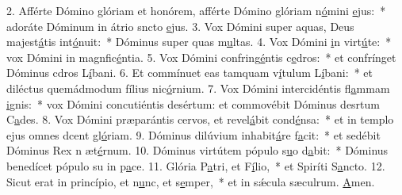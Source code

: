 2. Afférte Dómino glóriam et honórem, afférte Dómino glóriam n\uline{ó}mini \uline{e}jus:~* adoráte Dóminum in átrio sncto \uline{e}jus.
3. Vox Dómini super aquas, Deus majest\uline{á}tis int\uline{ó}nuit:~* Dóminus super quas m\uline{u}ltas.
4. Vox Dómini \uline{i}n virt\uline{ú}te:~* vox Dómini in magnfic\uline{é}ntia.
5. Vox Dómini confring\uline{é}ntis c\uline{e}dros:~* et confrínget Dóminus cdros L\uline{í}bani.
6. Et commínuet eas tamquam v\uline{í}tulum L\uline{í}bani:~* et diléctus quemádmodum fílius nic\uline{ó}rnium.
7. Vox Dómini intercidéntis fl\uline{a}mmam \uline{i}gnis:~* vox Dómini concutiéntis desértum: et commovébit Dóminus desrtum C\uline{a}des.
8. Vox Dómini præparántis cervos, et revel\uline{á}bit cond\uline{é}nsa:~* et in templo ejus omnes dcent gl\uline{ó}riam.
9. Dóminus dilúvium inhabit\uline{á}re f\uline{a}cit:~* et sedébit Dóminus Rex n æt\uline{é}rnum.
10. Dóminus virtútem pópulo s\uline{u}o d\uline{a}bit:~* Dóminus benedícet pópulo su in p\uline{a}ce.
11. Glória P\uline{a}tri, et F\uline{í}lio,~* et Spiríti S\uline{a}ncto.
12. Sicut erat in princípio, et n\uline{u}nc, et s\uline{e}mper,~* et in sǽcula sæculrum. \uline{A}men.

